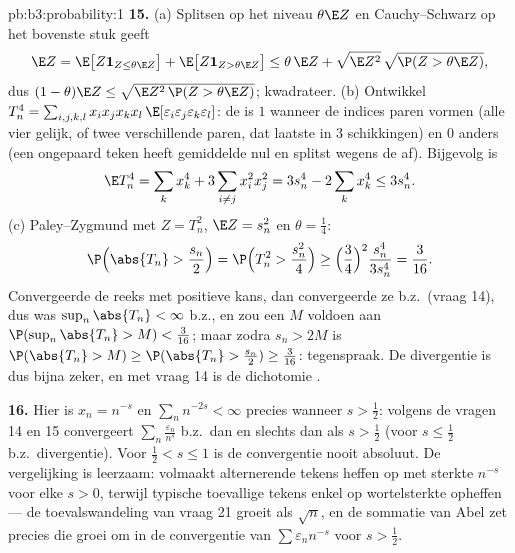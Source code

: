 \begin{solution}{pb:b3:probability:1}
\textbf{15.} (a) Splitsen op het niveau $\theta\E Z$ en
Cauchy--Schwarz op het bovenste stuk geeft
\[
\E Z = \E\bigl[Z\mathbf 1_{Z \leq \theta\E Z}\bigr] +
\E\bigl[Z\mathbf 1_{Z > \theta\E Z}\bigr]
\leq \theta\,\E Z + \sqrt{\E Z^2}\,
\sqrt{\P(Z > \theta\E Z)} ,
\]
dus $(1 - \theta)\E Z \leq \sqrt{\E Z^2\,\P(Z > \theta\E Z)}$;
kwadrateer. (b) Ontwikkel $T_n^4 = \sum_{i,j,k,l}x_ix_jx_kx_l\,
\E[\varepsilon_i\varepsilon_j\varepsilon_k\varepsilon_l]$: de
 is $1$ wanneer de indices paren vormen (alle
vier gelijk, of twee verschillende paren, dat laatste in $3$
schikkingen) en $0$ anders (een ongepaard teken heeft gemiddelde
nul en splitst wegens de  af). Bijgevolg is
\[
\E T_n^4 = \sum_kx_k^4 + 3\sum_{i\neq j}x_i^2x_j^2 =
3s_n^4 - 2\sum_kx_k^4 \leq 3s_n^4 .
\]
(c) Paley--Zygmund met $Z = T_n^2$, $\E Z = s_n^2$ en $\theta =
\frac14$:
\[
\P\Bigl(\abs{T_n} > \frac{s_n}2\Bigr) = \P\Bigl(T_n^2 >
\frac{s_n^2}4\Bigr) \geq \Bigl(\frac34\Bigr)^2
\frac{s_n^4}{3s_n^4} = \frac3{16} .
\]
Convergeerde de reeks met positieve kans, dan convergeerde ze
b.z.\ (vraag 14), dus was $\sup_n\abs{T_n} < \infty$ b.z., en zou
een $M$ voldoen aan $\P(\sup_n\abs{T_n} > M) < \frac3{16}$; maar
zodra $s_n > 2M$ is $\P(\abs{T_n} > M) \geq \P(\abs{T_n} >
\frac{s_n}2) \geq \frac3{16}$: tegenspraak. De divergentie is dus
bijna zeker, en met vraag 14 is de dichotomie .

\textbf{16.} Hier is $x_n = n^{-s}$ en $\sum_nn^{-2s} < \infty$
precies wanneer $s > \frac12$: volgens de vragen 14 en 15
convergeert $\sum_n\frac{\varepsilon_n}{n^s}$ b.z.\ dan en
slechts dan als $s > \frac12$ (voor $s \leq \frac12$ b.z.\
divergentie). Voor $\frac12 < s \leq 1$ is de convergentie nooit
absoluut. De vergelijking is leerzaam: volmaakt alternerende
tekens heffen op met sterkte $n^{-s}$ voor elke $s > 0$, terwijl
typische toevallige tekens enkel op wortelsterkte opheffen --- de
toevalswandeling van vraag 21 groeit als $\sqrt n$, en de
sommatie van Abel zet precies die groei om in de convergentie van
$\sum\varepsilon_nn^{-s}$ voor $s > \frac12$.


\end{solution}
